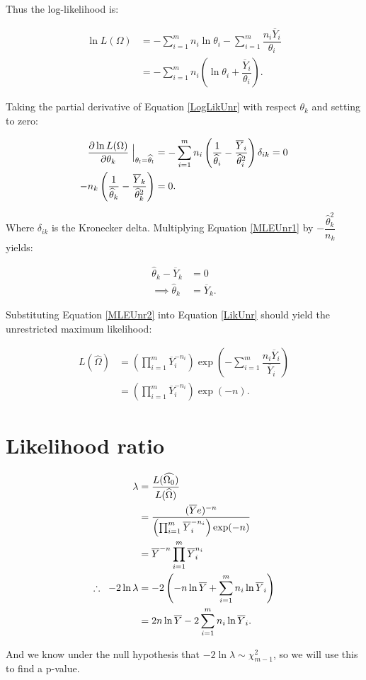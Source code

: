 \documentclass[12pt,a4paper]{article}
\newcommand{\eqn}[1]{Equation \ref{#1}}
\newcommand{\ovY}{\overline{Y}}
\newcommand{\wth}{\widehat{\theta}}
\begin{document}
    Thus the log-likelihood is:

    \begin{align}
        \ln{L(\Omega)} &= -\sum_{i=1}^m n_i \ln{\theta_i} - \sum_{i=1}^m \dfrac{n_i\ovY_i}{\theta_i} \nonumber \\
        &= -\sum_{i=1}^m n_i\left(\ln{\theta_i} + \dfrac{\ovY_i}{\theta_i}\right). \label{LogLikUnr}
    \end{align}

    Taking the partial derivative of \eqn{LogLikUnr} with respect $\theta_k$ and setting to zero:

    \begin{align}
        \dfrac{\partial \ln{L(\Omega)}}{\partial \theta_k} \Bigm\lvert_{\theta_l = \wth_l} &= -\sum_{i=1}^m n_i\left(\dfrac{1}{\wth_i} - \dfrac{\ovY_i}{\wth_i^2}\right) \delta_{ik} = 0 \nonumber\\
        -n_k\left(\dfrac{1}{\wth_k}-\dfrac{\ovY_k}{\wth_k^2}\right) &= 0. \label{MLEUnr1}
    \end{align}

    Where $\delta_{ik}$ is the Kronecker delta. Multiplying \eqn{MLEUnr1} by $-\dfrac{\wth_k^2}{n_k}$ yields:

    \begin{align}
        \wth_k - \ovY_k &= 0 \nonumber\\
        \implies \wth_k &= \ovY_k. \label{MLEUnr2}
    \end{align}

    Substituting \eqn{MLEUnr2} into \eqn{LikUnr} should yield the unrestricted maximum likelihood:

    \begin{align}
        L(\widehat{\Omega}) &= \left(\prod_{i=1}^m \ovY_i^{-n_i}\right) \exp\left(-\sum_{i=1}^m \dfrac{n_i\ovY_i}{\ovY_i}\right) \nonumber \\
        &= \left(\prod_{i=1}^m \ovY_i^{-n_i}\right)\exp(-n). \label{MLUnr}
    \end{align}

    \section{Likelihood ratio}
    \begin{align}
        \lambda &= \dfrac{L(\widehat{\Omega_0})}{L(\widehat{\Omega})} \nonumber \\
        &= \dfrac{(\ovY e)^{-n}}{\left(\prod_{i=1}^m \ovY_i^{-n_i}\right)\exp(-n)} \nonumber\\
        &= \ovY^{-n} \prod_{i=1}^m \ovY_i^{n_i} \nonumber \\
        \therefore \hspace{0.2cm} -2\ln{\lambda} &= -2 \left(-n\ln{\ovY} + \sum_{i=1}^m n_i \ln{\ovY_i}\right) \nonumber\\
        &= 2n\ln{\ovY} - 2\sum_{i=1}^{m} n_i \ln{\ovY_i}. \label{testSt} 
    \end{align}

    And we know under the null hypothesis that $-2\ln{\lambda} \sim \chi^2_{m-1}$, so we will use this to find a p-value.
\end{document}
